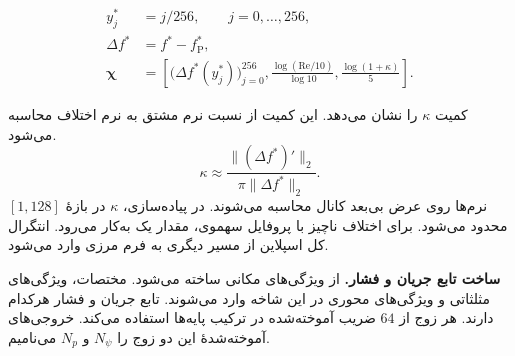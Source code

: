 \begin{equation}
\begin{aligned}
y_j^*&=j/256,\qquad j=0,\ldots,256,\\
\Delta f^*&=f^*-f_{\mathrm P}^*,\\
\boldsymbol\chi&=
\left[
\big(\Delta f^*(y_j^*)\big)_{j=0}^{256},
\frac{\log(\mathrm{Re}/10)}{\log 10},
\frac{\log(1+\kappa)}{5}
\right].
\end{aligned}
\label{eq:forward-flow-branch-input}
\end{equation}

کمیت $\kappa$  را نشان می‌دهد.
این کمیت از نسبت نرم مشتق به نرم اختلاف محاسبه می‌شود.
\[
\kappa \approx \frac{\|(\Delta f^*)'\|_2}{\pi\|\Delta f^*\|_2}.
\]
نرم‌ها روی عرض بی‌بعد کانال محاسبه می‌شوند.
در پیاده‌سازی، $\kappa$ در بازهٔ $[1,128]$ محدود می‌شود.
برای اختلاف ناچیز با پروفایل سهموی، مقدار یک به‌کار می‌رود.
انتگرال کل اسپلاین از مسیر دیگری به فرم مرزی وارد می‌شود.

\textbf{ساخت تابع جریان و فشار.}
 از ویژگی‌های مکانی ساخته می‌شود.
مختصات، ویژگی‌های مثلثاتی و ویژگی‌های محوری در این شاخه وارد می‌شوند.
تابع جریان و فشار هرکدام  دارند.
هر زوج از $64$ ضریب آموخته‌شده در ترکیب پایه‌ها استفاده می‌کند.
خروجی‌های آموخته‌شدهٔ این دو زوج را $N_\psi$ و $N_p$ می‌نامیم.

